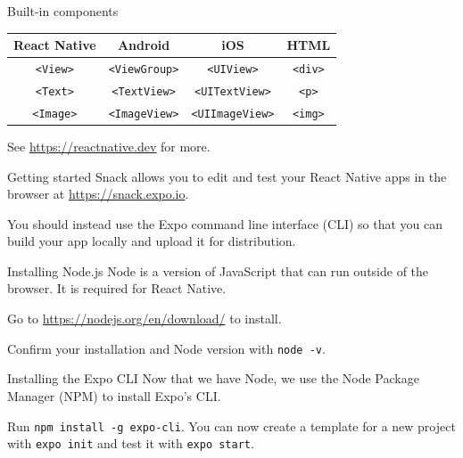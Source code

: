 \documentclass{beamer}
\begin{document}
\begin{frame}{Built-in components}
	\centering
	\begin{tabular}{|c|c|c|c|}
		\hline
		\textbf{React Native} & \textbf{Android} & \textbf{iOS} & \textbf{HTML} \\
		\hline
		\texttt{<View>} & \texttt{<ViewGroup>} & \texttt{<UIView>} & \texttt{<div>} \\
		\texttt{<Text>} & \texttt{<TextView>} & \texttt{<UITextView>} & \texttt{<p>} \\
		\texttt{<Image>} & \texttt{<ImageView>} & \texttt{<UIImageView>}  & \texttt{<img>} \\
		\hline
	\end{tabular}
	
	\bigskip\pause

	See \href{https://reactnative.dev}{https://reactnative.dev} for more.
\end{frame}

\begin{frame}{Getting started}
	Snack allows you to edit and test your React Native apps in the browser at \href{https://snack.expo.io}{https://snack.expo.io}.

	\bigskip\pause

	You should instead use the Expo command line interface (CLI) so that you can build your app locally and upload it for distribution.
\end{frame}

\begin{frame}{Installing Node.js}
	Node is a version of JavaScript that can run outside of the browser. It is required for React Native.

	\bigskip\pause

	Go to \href{https://nodejs.org/en/download/}{https://nodejs.org/en/download/} to install.

	\bigskip\pause

	Confirm your installation and Node version with \texttt{node -v}.
\end{frame}

\begin{frame}{Installing the Expo CLI}
	Now that we have Node, we use the Node Package Manager (NPM) to install Expo's CLI.

	\bigskip\pause

	Run \texttt{npm install -g expo-cli}. \pause You can now create a template for a new project with \texttt{expo init} and test it with \texttt{expo start}.
\end{frame}
\end{document}
